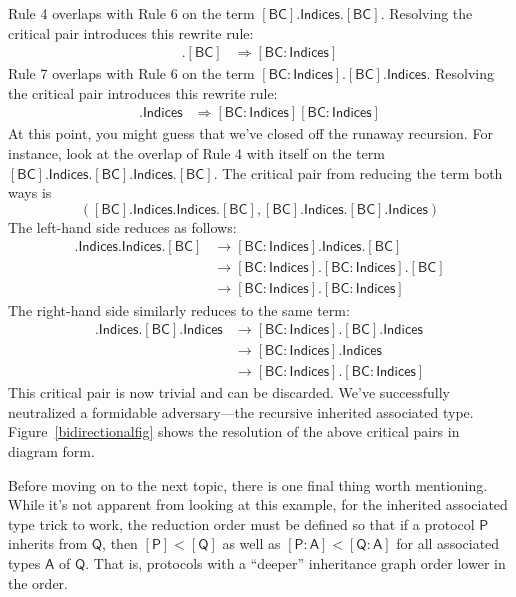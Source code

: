 \documentclass[a4paper,headsepline,bibliography=totoc,toc=flat,fleqn,twoside=semi]{scrbook}
\theoremstyle{definition}
\theoremstyle{definition}
\theoremstyle{definition}
\newcommand{\namesym}[1]{\mathsf{#1}}
\newcommand{\proto}[1]{\bm{\mathsf{#1}}}
\newcommand{\protosym}[1]{[\proto{#1}]}
\newcommand{\assocsym}[2]{[\proto{#1}\colon\namesym{#2}]}
\begin{document}
Rule 4 overlaps with Rule 6 on the term $\protosym{BC}.\namesym{Indices}.\protosym{BC}$. Resolving the critical pair introduces this rewrite rule:
\begin{align}
\assocsym{BC}{Indices}.\protosym{BC}&\Rightarrow\assocsym{BC}{Indices}\tag{7}
\end{align}
Rule 7 overlaps with Rule 6 on the term $\assocsym{BC}{Indices}.\protosym{BC}.\namesym{Indices}$. Resolving the critical pair introduces this rewrite rule:
\begin{align}
\assocsym{BC}{Indices}.\namesym{Indices}&\Rightarrow\assocsym{BC}{Indices}\assocsym{BC}{Indices}\tag{8}
\end{align}
At this point, you might guess that we've closed off the runaway recursion. For instance, look at the overlap of Rule 4 with itself on the term $\protosym{BC}.\namesym{Indices}.\protosym{BC}.\namesym{Indices}.\protosym{BC}$. The critical pair from reducing the term both ways is
\[(\protosym{BC}.\namesym{Indices}.\namesym{Indices}.\protosym{BC}, \protosym{BC}.\namesym{Indices}.\protosym{BC}.\namesym{Indices})\]
The left-hand side reduces as follows:
\begin{align*}
\protosym{BC}.\namesym{Indices}.\namesym{Indices}.\protosym{BC}&\rightarrow
\assocsym{BC}{Indices}.\namesym{Indices}.\protosym{BC}\tag{Rule 6}\\
&\rightarrow
\assocsym{BC}{Indices}.\assocsym{BC}{Indices}.\protosym{BC}\tag{Rule 8}\\
&\rightarrow
\assocsym{BC}{Indices}.\assocsym{BC}{Indices}\tag{Rule 7}
\end{align*}
The right-hand side similarly reduces to the same term:
\begin{align*}
\protosym{BC}.\namesym{Indices}.\protosym{BC}.\namesym{Indices}&\rightarrow
\assocsym{BC}{Indices}.\protosym{BC}.\namesym{Indices}\tag{Rule 6}\\
&\rightarrow
\assocsym{BC}{Indices}.\namesym{Indices}\tag{Rule 7}\\
&\rightarrow
\assocsym{BC}{Indices}.\assocsym{BC}{Indices}\tag{Rule 8}
\end{align*}
This critical pair is now trivial and can be discarded. We've successfully neutralized a formidable adversary---the recursive inherited associated type. Figure~\ref{bidirectionalfig} shows the resolution of the above critical pairs in diagram form.

Before moving on to the next topic, there is one final thing worth mentioning. While it's not apparent from looking at this example, for the inherited associated type trick to work, the reduction order must be defined so that if a protocol $\proto{P}$ inherits from $\proto{Q}$, then $\protosym{P}<\protosym{Q}$ as well as $\assocsym{P}{A}<\assocsym{Q}{A}$ for all associated types $\namesym{A}$ of $\proto{Q}$. That is, protocols with a ``deeper'' inheritance graph order lower in the order.
\end{document}

